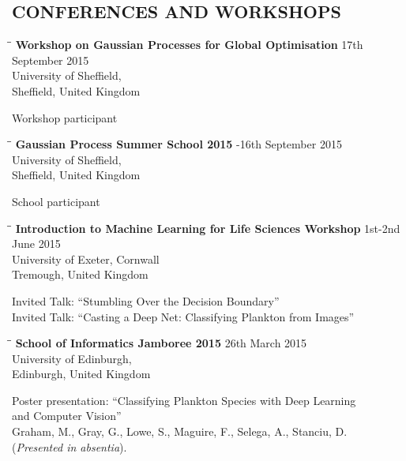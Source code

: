 \documentclass{res}
\begin{document}
\begin{resume}
\section{CONFERENCES AND WORKSHOPS}
  \vspace{-0.05in}

\begin{tabbing}
\hspace{2in}\= \hspace{2.6in}\= \kill
{\bf Workshop on Gaussian Processes for Global Optimisation} \> \> 17th September 2015\\
\> \>University of Sheffield,  \\
\> \> Sheffield, United Kingdom\\
\end{tabbing}\vspace{-40pt}
Workshop participant

\begin{tabbing}
\hspace{2in}\= \hspace{2.6in}\= \kill
{\bf Gaussian Process Summer School 2015} \> -16th September 2015\\
\> \>University of Sheffield,  \\
\> \> Sheffield, United Kingdom\\
\end{tabbing}\vspace{-40pt}
School participant

\begin{tabbing}
\hspace{2in}\= \hspace{2.6in}\= \kill
{\bf Introduction to Machine Learning for Life Sciences Workshop} \> \> 1st-2nd June 2015\\
\> \>University of Exeter, Cornwall \\
\> \> Tremough, United Kingdom\\
\end{tabbing}\vspace{-40pt}
Invited Talk: ``Stumbling Over the Decision Boundary''\\
Invited Talk: ``Casting a Deep Net: Classifying Plankton from Images''


\begin{tabbing}
\hspace{2in}\= \hspace{2.6in}\= \kill
{\bf School of Informatics Jamboree 2015} \> \> 26th March 2015\\
\> \>University of Edinburgh,  \\
\> \> Edinburgh, United Kingdom\\
\end{tabbing}\vspace{-40pt}
Poster presentation: ``Classifying Plankton Species with Deep Learning \\
and Computer Vision''\\
Graham, M., Gray, G., Lowe, S., Maguire, F., Selega, A., Stanciu, D. \\
(\emph{Presented in absentia}).



\end{resume}
\end{document}
